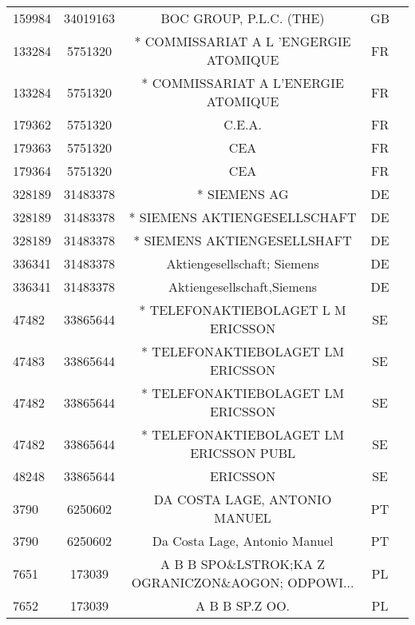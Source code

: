 \begin{longtable}{|l|c|c|c|c|}
    159984 &   34019163 &                            BOC GROUP, P.L.C. (THE) &      GB \\
    133284 &    5751320 &              * COMMISSARIAT A L 'ENGERGIE ATOMIQUE &      FR \\
    133284 &    5751320 &                * COMMISSARIAT A L'ENERGIE ATOMIQUE &      FR \\
    179362 &    5751320 &                                             C.E.A. &      FR \\
    179363 &    5751320 &                                                CEA &      FR \\
    179364 &    5751320 &                                                CEA &      FR \\
    328189 &   31483378 &                                       * SIEMENS AG &      DE \\
    328189 &   31483378 &                       * SIEMENS AKTIENGESELLSCHAFT &      DE \\
    328189 &   31483378 &                        * SIEMENS AKTIENGESELLSHAFT &      DE \\
    336341 &   31483378 &                        Aktiengesellschaft; Siemens &      DE \\
    336341 &   31483378 &                         Aktiengesellschaft,Siemens &      DE \\
     47482 &   33865644 &                 * TELEFONAKTIEBOLAGET L M ERICSSON &      SE \\
     47483 &   33865644 &                  * TELEFONAKTIEBOLAGET LM ERICSSON &      SE \\
     47482 &   33865644 &                  * TELEFONAKTIEBOLAGET LM ERICSSON &      SE \\
     47482 &   33865644 &             * TELEFONAKTIEBOLAGET LM ERICSSON PUBL &      SE \\
     48248 &   33865644 &                                           ERICSSON &      SE \\
      3790 &    6250602 &                      DA COSTA LAGE, ANTONIO MANUEL &      PT \\
      3790 &    6250602 &                      Da Costa Lage, Antonio Manuel &      PT \\
      7651 &     173039 &  A B B SPO\&LSTROK;KA Z OGRANICZON\&AOGON; ODPOWI... &      PL \\
      7652 &     173039 &                                     A B B SP.Z OO. &      PL \\

\end{longtable}
